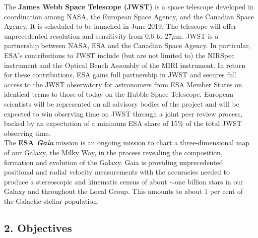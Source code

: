 \begin{framed}
The {\bf James Webb Space Telescope (JWST)} is a space telescope
developed in coordination among NASA, the European Space Agency, and
the Canadian Space Agency. It is scheduled to be launched in June
2019. The telescope will offer unprecedented resolution and
sensitivity from 0.6 to 27$\mu$m.
JWST is a partnership between NASA, ESA and the Canadian Space Agency.
In particular, ESA's contributions to JWST include (but are not
limited to) the NIRSpec instrument and the Optical Bench Assembly of
the MIRI instrument.  In return for these contributions, ESA gains
full partnership in JWST and secures full access to the JWST
observatory for astronomers from ESA Member States on identical terms
to those of today on the Hubble Space Telescope. European scientists
will be represented on all advisory bodies of the project and will be
expected to win observing time on JWST through a joint peer review
process, backed by an expectation of a minimum ESA share of 15\% of
the total JWST observing time. \\


The \textbf{ESA {\it Gaia}} mission is an ongoing mission to chart a
three-dimensional map of our Galaxy, the Milky Way, in the process
revealing the composition, formation and evolution of the Galaxy. Gaia
is providing unprecedented positional and radial velocity measurements
with the accuracies needed to produce a stereoscopic and kinematic
census of about $\sim$one billion stars in our Galaxy and throughout
the Local Group. This amounts to about 1 per cent of the Galactic
stellar population.
\end{framed}




\subsection*{2. Objectives}

